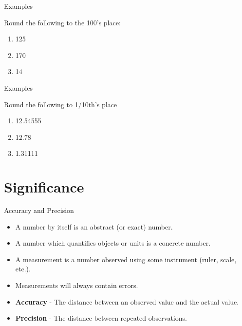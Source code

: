 \documentclass{beamer}
\begin{document}
\begin{frame}{Examples}

Round the following to the 100's place:
\begin{enumerate}
    \item<1-> 125 
    \item<3-> 170 
    \item<5-> 14 
\end{enumerate}
\end{frame}


\begin{frame}{Examples}

Round the following to 1/10th's place
\begin{enumerate}
    \item<1-> 12.54555 
    \item<3-> 12.78 
    \item<5-> 1.31111 
\end{enumerate}
\end{frame}

\section{Significance}
\begin{frame}{Accuracy and Precision}
\begin{itemize}[<+->]
    \item A number by itself is an abstract (or exact) number.
    \item A number which quantifies objects or units is a concrete number.
    \item A measurement is a number observed using some instrument (ruler, scale, etc.).
    \item Measurements will always contain errors.
    \item {\bf Accuracy} - The distance between an observed value and the actual value.
    \item {\bf Precision} - The distance between repeated observations.
\end{itemize}
\end{frame}
\end{document}
